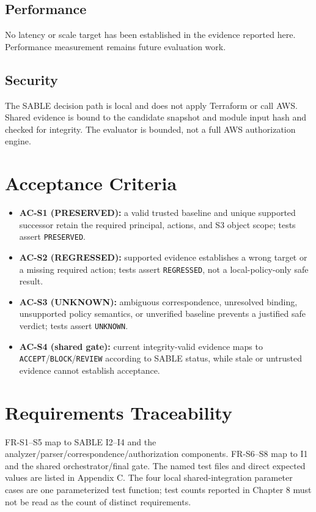 \subsection{Performance}
No latency or scale target has been established in the evidence reported here. Performance measurement remains future evaluation work.
\subsection{Security}
The SABLE decision path is local and does not apply Terraform or call AWS. Shared evidence is bound to the candidate snapshot and module input hash and checked for integrity. The evaluator is bounded, not a full AWS authorization engine.

\section{Acceptance Criteria}
\begin{sloppypar}
\begin{itemize}
    \item \textbf{AC-S1 (PRESERVED):} a valid trusted baseline and unique supported successor retain the required principal, actions, and S3 object scope; tests assert \texttt{PRESERVED}.
    \item \textbf{AC-S2 (REGRESSED):} supported evidence establishes a wrong target or a missing required action; tests assert \texttt{REGRESSED}, not a local-policy-only safe result.
    \item \textbf{AC-S3 (UNKNOWN):} ambiguous correspondence, unresolved binding, unsupported policy semantics, or unverified baseline prevents a justified safe verdict; tests assert \texttt{UNKNOWN}.
    \item \textbf{AC-S4 (shared gate):} current integrity-valid evidence maps to \texttt{ACCEPT}/\texttt{BLOCK}/\texttt{REVIEW} according to SABLE status, while stale or untrusted evidence cannot establish acceptance.
\end{itemize}
\end{sloppypar}

\section{Requirements Traceability}
\begin{sloppypar}
FR-S1--S5 map to SABLE I2--I4 and the analyzer/parser/correspondence/authorization components. FR-S6--S8 map to I1 and the shared orchestrator/final gate. The named test files and direct expected values are listed in Appendix C. The four local shared-integration parameter cases are one parameterized test function; test counts reported in Chapter 8 must not be read as the count of distinct requirements.
\end{sloppypar}
